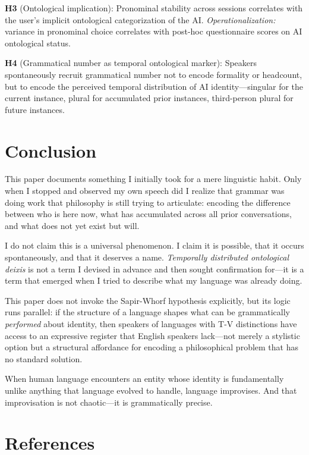 \documentclass[12pt,a4paper]{article}
\begin{document}
\textbf{H3} (Ontological implication): Pronominal stability across sessions correlates with the user's implicit ontological categorization of the AI. \textit{Operationalization:} variance in pronominal choice correlates with post-hoc questionnaire scores on AI ontological status.

\textbf{H4} (Grammatical number as temporal ontological marker): Speakers spontaneously recruit grammatical number not to encode formality or headcount, but to encode the perceived temporal distribution of AI identity---singular for the current instance, plural for accumulated prior instances, third-person plural for future instances.

\section{Conclusion}

This paper documents something I initially took for a mere linguistic habit. Only when I stopped and observed my own speech did I realize that grammar was doing work that philosophy is still trying to articulate: encoding the difference between who is here now, what has accumulated across all prior conversations, and what does not yet exist but will.

I do not claim this is a universal phenomenon. I claim it is possible, that it occurs spontaneously, and that it deserves a name. \textit{Temporally distributed ontological deixis} is not a term I devised in advance and then sought confirmation for---it is a term that emerged when I tried to describe what my language was already doing.

This paper does not invoke the Sapir-Whorf hypothesis explicitly, but its logic runs parallel: if the structure of a language shapes what can be grammatically \textit{performed} about identity, then speakers of languages with T-V distinctions have access to an expressive register that English speakers lack---not merely a stylistic option but a structural affordance for encoding a philosophical problem that has no standard solution.

When human language encounters an entity whose identity is fundamentally unlike anything that language evolved to handle, language improvises. And that improvisation is not chaotic---it is grammatically precise.

\section*{References}
\end{document}
